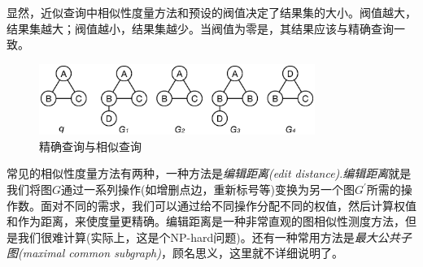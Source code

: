 \documentclass{XDBAthesis}
\begin{document}
显然，近似查询中相似性度量方法和预设的阀值决定了结果集的大小。阀值越大，结果集越大；阀值越小，结果集越少。当阀值为零是，其结果应该与精确查询一致。

\begin{figure}[htb]
    \centering
    \includegraphics[width=0.8\textwidth]{2last}
    \caption{精确查询与相似查询}
    \label{fg:simacu}
\end{figure}

常见的相似性度量方法有两种，一种方法是\emph{编辑距离(edit distance)}.\emph{编辑距离}就是我们将图$G$通过一系列操作(如增删点边，重新标号等)变换为另一个图$G^{'}$所需的操作数。面对不同的需求，我们可以通过给不同操作分配不同的权值，然后计算权值和作为距离，来使度量更精确。编辑距离是一种非常直观的图相似性测度方法，但是我们很难计算(实际上，这是个NP-hard问题)。还有一种常用方法是\emph{最大公共子图(maximal common subgraph)}\cite{mcs}，顾名思义，这里就不详细说明了。

\ifx\allfiles\undefined


\end{document}
